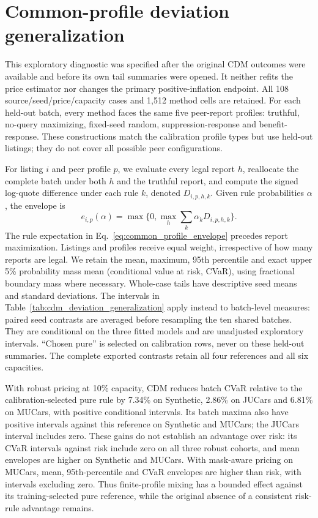 \section{Common-profile deviation generalization}
\label{sec:cdm_deviation_generalization}
This exploratory diagnostic was specified after the original CDM outcomes
were available and before its own tail summaries were opened. It neither
refits the price estimator nor changes the primary positive-inflation
endpoint. All 108 source/seed/price/capacity cases and 1,512 method cells
are retained. For each held-out batch, every method faces the same five
peer-report profiles: truthful, no-query maximizing, fixed-seed random,
suppression-response and benefit-response. These constructions match the
calibration profile types but use held-out listings; they do not cover
all possible peer configurations.

For listing $i$ and peer profile $p$, we evaluate every legal report $h$,
reallocate the complete batch under both $h$ and the truthful report, and
compute the signed log-quote difference under each rule $k$, denoted
$D_{i,p,h,k}$. Given rule probabilities $\alpha$, the envelope is
\begin{equation}
 e_{i,p}(\alpha)=\max\{0,\max_h\sum_k\alpha_kD_{i,p,h,k}\}.
\label{eq:common_profile_envelope}
\end{equation}
The rule expectation in Eq.~\eqref{eq:common_profile_envelope} precedes
report maximization. Listings and profiles
receive equal weight, irrespective of how many reports are legal. We
retain the mean, maximum, 95th percentile and exact upper 5\% probability
mass mean (conditional value at risk, CVaR), using fractional boundary mass
where necessary. Whole-case
tails have descriptive seed means and standard deviations. The intervals
in Table~\ref{tab:cdm_deviation_generalization} apply instead to batch-level
measures: paired seed contrasts are averaged before resampling the ten
shared batches. They are conditional on the three fitted models and are
unadjusted exploratory intervals. ``Chosen pure'' is selected on calibration
rows, never on these held-out summaries. The complete exported contrasts
retain all four references and all six capacities.

With robust pricing at 10\% capacity, CDM reduces batch CVaR relative to
the calibration-selected pure rule by 7.34\% on Synthetic, 2.86\% on JUCars
and 6.81\% on MUCars, with positive conditional intervals. Its batch maxima
also have positive intervals against this reference on Synthetic and MUCars;
the JUCars interval includes zero. These gains do not establish an advantage
over risk: its CVaR intervals against risk include zero on all three robust
cohorts, and mean envelopes are higher on Synthetic and MUCars. With
mask-aware pricing on MUCars, mean, 95th-percentile and CVaR envelopes are
higher than risk, with intervals excluding zero. Thus finite-profile mixing
has a bounded effect against its training-selected pure reference, while
the original absence of a consistent risk-rule advantage remains.

